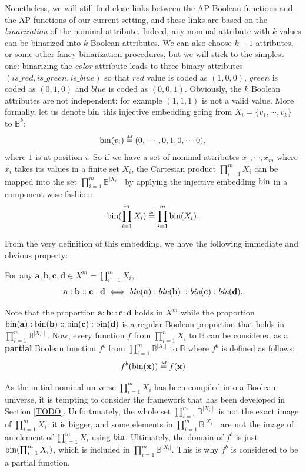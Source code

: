 Nonetheless, we will still find close links between the AP Boolean functions
and the AP functions of our current setting, and these links are based on the
\textit{binarization} of the nominal attribute. Indeed, any nominal attribute
with $k$ values can be binarized into $k$ Boolean attributes. We can also choose
$k- 1$ attributes, or some other fancy binarization procedures, but we will
stick to the simplest one:
binarizing the \textit{color} attribute leads to three binary attributes
$(is\_red, is\_green, is\_blue)$ so that $red$ value is coded as $(1, 0, 0)$,
$green$ is coded as $(0, 1 , 0)$ and $blue$ is coded as $(0, 0, 1)$. Obviously,
the $k$ Boolean attributes are not independent: for example $(1, 1, 1)$  is not
a valid value.  More formally, let us denote $\text{bin}$ this injective embedding
going from $X_i=\{v_1, \cdots, v_k\}$ to $\mathbb{B}^k$:
$$\bin(v_i) \eqdef (0, \cdots, 0, 1, 0, \cdots 0),$$
where $1$ is at position $i$.  So if we have a set of nominal attributes $x_1,
\cdots, x_m$ where $x_i$ takes its values in a finite set $X_i$, the Cartesian
product  $\prod_{i=1}^m X_i$ can be mapped into the set $\prod_{i=1}^m
\mathbb{B}^{\mid X_i \mid}$ by applying the injective embedding $\text{bin}$ in a
component-wise fashion:
$$\bin(\prod_{i=1}^m X_i) \eqdef \prod_{i=1}^m  \bin(X_i).$$

From the very definition of this embedding, we have the following immediate and
obvious property:
\begin{property}
  \label{PROPER:analogy_nominal_iff_analogy_bin}
  For any $\mathbf{a}, \mathbf{b}, \mathbf{c}, \mathbf{d} \in X^m =
  \prod_{i=1}^m X_i$,
$$\mathbf{a}: \mathbf{b}:: \mathbf{c}: \mathbf{d} \iff
 \emph{bin}(\mathbf{a}): \emph{bin}(\mathbf{b}):: \emph{bin}(\mathbf{c}):
  \emph{bin}(\mathbf{d}).$$
 \end{property}
 \noindent
 Note that the proportion $\mathbf{a}: \mathbf{b}:: \mathbf{c}: \mathbf{d}$
 holds in $X^m$ while the proportion $\text{bin}(\mathbf{a}): \text{bin}(\mathbf{b})::
 \text{bin}(\mathbf{c}): \text{bin}(\mathbf{d})$ is a regular Boolean proportion that holds
 in $\prod_{i=1}^m\mathbb{B}^{\mid X_i \mid}$.  Now, every function $f$ from
 $\prod_{i=1}^n X_i$ to $\mathbb{B}$ can be considered as a \textbf{partial}
 Boolean function $f^b$ from $\prod_{i=1}^m \mathbb{B}^{|X_i|}$ to $\mathbb{B}$
 where $f^b$ is defined as follows:
$$
f^b(\bin(\mathbf{x})) \eqdef f(\mathbf{x})
$$

As the initial nominal universe  $\prod_{i=1}^m X_i$  has been compiled into a
Boolean universe, it is tempting to consider the framework that has been
developed in Section \ref{TODO}. Unfortunately, the whole set $\prod_{i=1}^m
\mathbb{B}^{\mid X_i\mid}$ is not the exact image of $\prod_{i=1}^m X_i$: it is
bigger, and some elements in $\prod_{i=1}^m  \mathbb{B}^{\mid X_i\mid}$ are not
the image of an element of $\prod_{i=1}^m X_i$ using $\text{bin}$.  Ultimately, the
domain of $f^b$ is just $\text{bin}(\prod_{i=1}^m X_i)$, which is included in
$\prod_{i=1}^m \mathbb{B}^{|X_i|}$. This is why $f^b$ is considered to be a
partial function.

